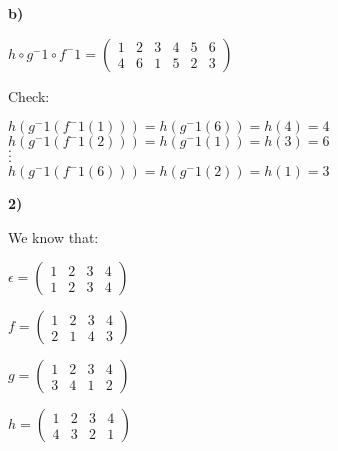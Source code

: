 \documentclass{article}
\begin{document}
\bigskip

\hspace{.2in}\textbf{b)}

$h \circ g^-1 \circ f^-1=(\begin{smallmatrix}
1 & 2 & 3 & 4 & 5 & 6 \\	
4 & 6 & 1 & 5 & 2 & 3
\end{smallmatrix})$

\medskip
				Check: \begin{center}
				$h(g^-1(f^-1(1)))=h(g^-1(6)) =h(4)=4 $ \\
				
				$h(g^-1(f^-1(2)))=h(g^-1(1))=h(3)=6 $ \\
									          $\cdot$ \\
									          $\cdot$ \\
									          $\cdot $\\
				$h(g^-1(f^-1(6)))=h(g^-1(2))=h(1)=3 $					
				
				\end{center}
					   

\newpage


 \textbf{2)}

We know that: 


$\epsilon =(\begin{smallmatrix}                   
1 & 2& 3 &4 \\                                                                                                        
1 & 2 & 3& 4
\end{smallmatrix}) $

\medskip

  			         
$f=(\begin{smallmatrix}
1 & 2& 3 &4 \\
2 & 1 & 4 & 3
\end{smallmatrix})$

\medskip



$g=(\begin{smallmatrix}
1 & 2& 3 &4 \\
3 & 4 & 1 & 2
\end{smallmatrix})$


\medskip


$h=(\begin{smallmatrix}
1 & 2& 3 &4 \\
4 & 3 & 2 & 1
\end{smallmatrix})$%
\end{document}
